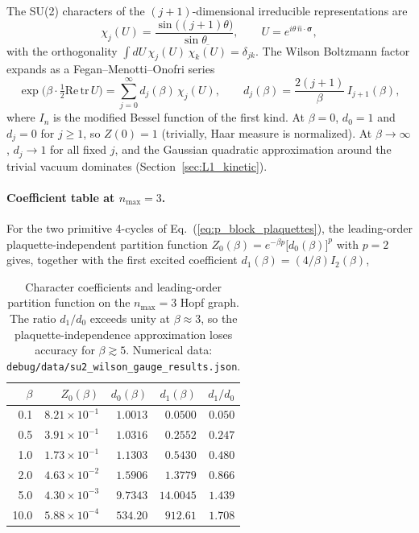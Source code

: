 \documentclass[11pt]{article}
\begin{document}
The SU(2) characters of the $(j+1)$-dimensional irreducible
representations are
\begin{equation}
\chi_j(U) = \frac{\sin\bigl((j+1)\theta\bigr)}{\sin\theta},
\qquad U = e^{i\theta\,\hat{n}\cdot\boldsymbol{\sigma}},
\label{eq:characters}
\end{equation}
with the orthogonality $\int dU\, \chi_j(U)\,\overline{\chi_k(U)} =
\delta_{jk}$.  The Wilson Boltzmann factor expands as a
Fegan--Menotti--Onofri series~\cite{creutz1983}
\begin{equation}
\exp\bigl(\beta \cdot \tfrac{1}{2}\mathrm{Re}\,\mathrm{tr}\,U\bigr)
= \sum_{j=0}^{\infty} d_j(\beta)\,\chi_j(U),
\qquad
d_j(\beta) = \frac{2(j+1)}{\beta}\,I_{j+1}(\beta),
\label{eq:character_expansion}
\end{equation}
where $I_n$ is the modified Bessel function of the first kind.  At
$\beta = 0$, $d_0 = 1$ and $d_j = 0$ for $j \geq 1$, so $Z(0) = 1$
(trivially, Haar measure is normalized).  At $\beta \to \infty$,
$d_j \to 1$ for all fixed $j$, and the Gaussian quadratic
approximation around the trivial vacuum dominates
(Section~\ref{sec:L1_kinetic}).

\paragraph*{Coefficient table at $n_{\max} = 3$.}  For the two primitive
4-cycles of Eq.~(\ref{eq:p_block_plaquettes}), the leading-order
plaquette-independent partition function
$Z_0(\beta) = e^{-\beta p}\bigl[d_0(\beta)\bigr]^p$ with $p = 2$
gives, together with the first excited coefficient $d_1(\beta) =
(4/\beta) I_2(\beta)$,

\begin{table}[h]
\centering
\caption{Character coefficients and leading-order partition function
on the $n_{\max} = 3$ Hopf graph.  The ratio $d_1/d_0$ exceeds unity
at $\beta \approx 3$, so the plaquette-independence approximation
loses accuracy for $\beta \gtrsim 5$.  Numerical data:
\texttt{debug/data/su2\_wilson\_gauge\_results.json}.}
\label{tab:char_coeffs}
\begin{tabular}{rrrrr}
\toprule
$\beta$ & $Z_0(\beta)$ & $d_0(\beta)$ & $d_1(\beta)$ & $d_1/d_0$ \\
\midrule
 0.1 & $8.21\times 10^{-1}$ & $1.0013$ & $0.0500$ & $0.050$ \\
 0.5 & $3.91\times 10^{-1}$ & $1.0316$ & $0.2552$ & $0.247$ \\
 1.0 & $1.73\times 10^{-1}$ & $1.1303$ & $0.5430$ & $0.480$ \\
 2.0 & $4.63\times 10^{-2}$ & $1.5906$ & $1.3779$ & $0.866$ \\
 5.0 & $4.30\times 10^{-3}$ & $9.7343$ & $14.0045$ & $1.439$ \\
10.0 & $5.88\times 10^{-4}$ & $534.20$ & $912.61$  & $1.708$ \\
\bottomrule
\end{tabular}
\end{table}
\end{document}
